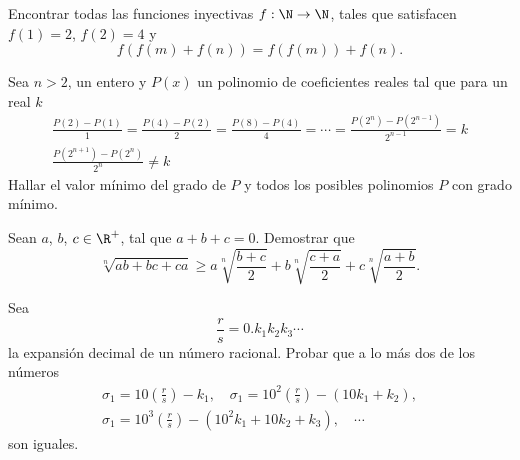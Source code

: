 \begin{section-problem}
    Encontrar todas las funciones inyectivas $f: \N \rightarrow \N$, tales que satisfacen $f(1) = 2$, $f(2) = 4$ y
    \[f(f(m) + f(n)) =  f(f(m)) + f(n).\]
\end{section-problem}

\begin{section-problem}
    Sea $n > 2$, un entero y $P(x)$ un polinomio de coeficientes reales tal que para un real $k$
    \begin{gather*}
        \frac{P(2) - P(1)}{1} = \frac{P(4) - P(2)}{2} = \frac{P(8) - P(4)}{4} = \cdots = \frac{P(2^n) - P(2^{n - 1})}{2^{n - 1}} = k \\
        \frac{P(2^{n + 1}) - P(2^n)}{2^n} \neq k
    \end{gather*}
    Hallar el valor mínimo del grado de $P$ y todos los posibles polinomios $P$ con grado mínimo.
\end{section-problem}

\begin{section-problem}
    Sean $a$, $b$, $c \in \R^+$, tal que $a + b + c = 0$.
    Demostrar que
    \[\sqrt[n]{ab + bc + ca} \geq a \sqrt[n]{\frac{b + c}{2}} + b \sqrt[n]{\frac{c + a}{2}} + c \sqrt[n]{\frac{a + b}{2}}.\]
\end{section-problem}

\begin{section-problem}
    Sea
    \[\frac{r}{s} = 0. k_1 k_2 k_3 \cdots\]
    la expansión decimal de un número racional.
    Probar que a lo más dos de los números
    \begin{gather*}
        \sigma_1 = 10 \left(\frac{r}{s}\right) - k_1, \quad
        \sigma_1 = 10^2 \left(\frac{r}{s}\right) - (10 k_1 + k_2),\\
        \sigma_1 = 10^3 \left(\frac{r}{s}\right) - (10^2 k_1 + 10 k_2 + k_3), \quad \cdots
    \end{gather*}
    son iguales.

\end{section-problem}